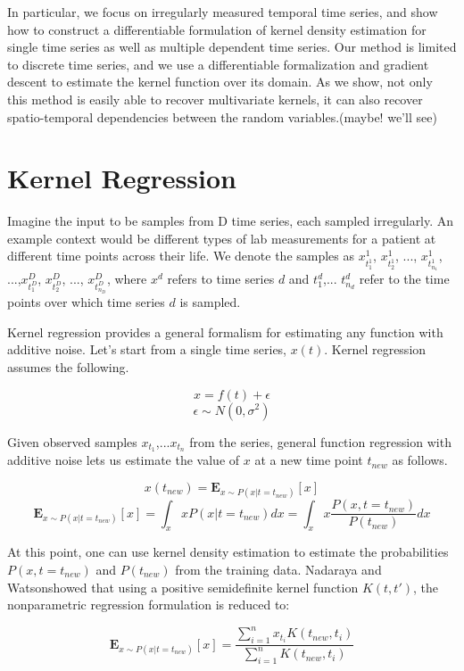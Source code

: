 \documentclass{article} %
\begin{document}
In particular, we focus on irregularly measured temporal time series, and show how to construct a differentiable formulation of kernel density estimation for single time series as well as multiple dependent time series. Our method is limited to discrete time series, and we use a differentiable formalization and gradient descent to estimate the kernel function over its domain. As we show, not only this method is easily able to recover multivariate kernels, it can also recover spatio-temporal dependencies between the random variables.(maybe! we'll see) 

\section{Kernel Regression}

Imagine the input to be samples from D time series, each sampled irregularly. An example context would be different types of lab measurements for a patient at different time points across their life. We denote the samples as ${x^1_{t^1_1}}$, ${x^1_{t^1_2}}$, ..., ${x^1_{t^1_{n_1}}}$, ...,${x^D_{t^D_1}}$, ${x^D_{t^D_2}}$, ..., ${x^D_{t^D_{n_D}}}$, where $x^d$ refers to time series $d$ and $t^d_1$,... $t^d_{n_d}$ refer to the time points over which time series $d$ is sampled. 

Kernel regression provides a general formalism for estimating any function with additive noise. Let's start from a single time series, $x(t)$. Kernel regression assumes the following.

$$ x = f(t) + \epsilon $$
$$\epsilon \sim N(0,\sigma^2)$$

Given observed samples $x_{t_1}$,...$x_{t_n}$ from the series, general function regression with additive noise lets us estimate the value of $x$ at a new time point $t_{new}$ as follows. 

$$x(t_{new}) = \mathbf{E}_{x \sim P(x|t=t_{new})}[x] $$
$$\mathbf{E}_{x \sim P(x|t=t_{new})}[x] = \int_x x P(x|t=t_{new}) dx =\int_x x \frac{P(x , t=t_{new})}{P(t_{new})} dx $$

At this point, one can use kernel density estimation to estimate the probabilities $P(x , t=t_{new})$ and $P(t_{new})$ from the training data. Nadaraya\cite{} and Watson\cite{}showed that using a positive semidefinite kernel function $K(t, t')$, the nonparametric regression formulation is reduced to:

\begin{equation}
\mathbf{E}_{x \sim P(x|t=t_{new})}[x] = \frac{\sum_{i=1}^n{x_{t_{i}}K(t_{new}, t_{i})}} {\sum_{i=1}^n{K(t_{new}, t_{i})}}
\end{equation}
\end{document}
